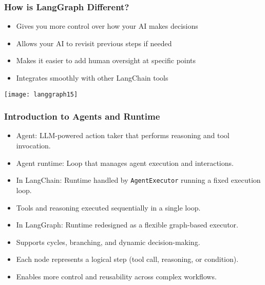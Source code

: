 \begin{frame}[fragile]\frametitle{How is LangGraph Different?}


      \begin{itemize}
        \item Gives you more control over how your AI makes decisions
        \item Allows your AI to revisit previous steps if needed
        \item Makes it easier to add human oversight at specific points
        \item Integrates smoothly with other LangChain tools
      \end{itemize}


\begin{center}
\texttt{[image: langgraph15]}
\end{center}

\end{frame}

\begin{frame}[fragile]\frametitle{Introduction to Agents and Runtime}
      \begin{itemize}
        \item Agent: LLM-powered action taker that performs reasoning and tool invocation.
        \item Agent runtime: Loop that manages agent execution and interactions.
        \item In LangChain: Runtime handled by \texttt{AgentExecutor} running a fixed execution loop.
        \item Tools and reasoning executed sequentially in a single loop.
        \item In LangGraph: Runtime redesigned as a flexible graph-based executor.
        \item Supports cycles, branching, and dynamic decision-making.
        \item Each node represents a logical step (tool call, reasoning, or condition).
        \item Enables more control and reusability across complex workflows.
      \end{itemize}
\end{frame}

